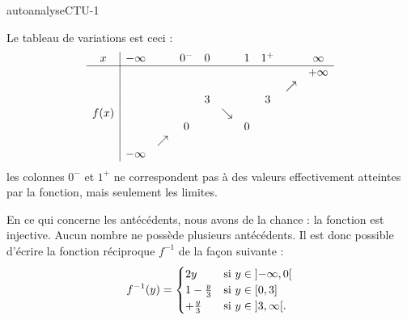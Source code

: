 
\begin{corrige}{autoanalyseCTU-1}

\begin{center}
   
\end{center}

Le tableau de variations est ceci :
\begin{equation*}
    \begin{array}[]{c|ccccccccc}
        x&-\infty&&0^-&0&&1&1^+&&\infty\\
        \hline
        &&&&&&&&&+\infty\\
        &&&&&&&&\nearrow&\\
        &&&&3&&&3&&\\
        f(x)&&&&&\searrow&&&&\\
        &&&0&&&0&&&\\
        &&\nearrow&&&&&&&\\
        &-\infty&&&&&&&&\\
    \end{array}
\end{equation*}
les colonnes \( 0^-\) et \( 1^+\) ne correspondent pas à des valeurs effectivement atteintes par la fonction, mais seulement les limites.

En ce qui concerne les antécédents, nous avons de la chance : la fonction est injective. Aucun nombre ne possède plusieurs antécédents. Il est donc possible d'écrire la fonction réciproque \( f^{-1}\) de la façon suivante :
\begin{equation}
    f^{-1}(y)=\begin{cases}
    2y   &   \text{si \( y\in\mathopen] -\infty , 0 \mathclose[\)}\\
        1-\frac{ y }{ 3 }    &    \text{si \( y\in\mathopen[ 0 , 3 \mathclose]\)}\\
    +\frac{ y }{ 3 }    &    \text{si \( y\in\mathopen] 3 , \infty \mathclose[\)}.
    \end{cases}
\end{equation}

\end{corrige}   

